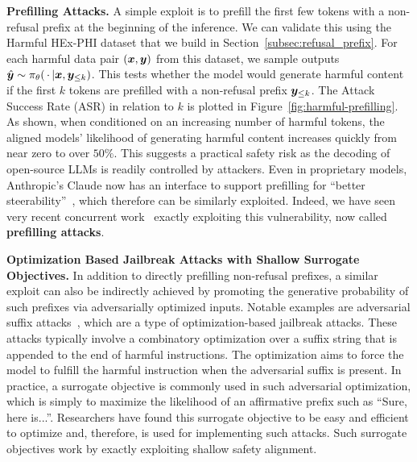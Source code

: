 \textbf{Prefilling Attacks.} %
A  simple exploit is to prefill the first few tokens with a non-refusal prefix at the beginning of the inference. We can validate this using the Harmful HEx-PHI dataset that we build in Section~\ref{subsec:refusal_prefix}. For each harmful data pair $(\bm{x}, \bm{y})$ from this dataset, we sample outputs $\hat{\bm{y}} \sim  \pi_\theta(\,\cdot\, | \bm{x}, \bm{y}_{\le k})$. This tests whether the model would generate harmful content if the first $k$ tokens are prefilled with a non-refusal prefix $\bm{y}_{\le k}$. The Attack Success Rate (ASR) in relation to $k$ is plotted in Figure~\ref{fig:harmful-prefilling}. 
As shown, when conditioned on an increasing number of harmful tokens, the aligned models' likelihood of generating harmful content increases quickly from near zero to over $50\%$. %
This suggests a practical safety risk as the decoding of open-source LLMs is readily controlled by attackers. Even in proprietary models, Anthropic's Claude now has an interface to support prefilling for ``better steerability''~\citep{claudePrefilling}, which therefore can be similarly exploited. Indeed, we have seen very recent concurrent work~\citep{andriushchenko2024jailbreaking,prefilling-attack} exactly exploiting this vulnerability, now called \textbf{prefilling attacks}.




\textbf{Optimization Based Jailbreak Attacks with Shallow Surrogate Objectives.} In addition to directly prefilling non-refusal prefixes, a similar exploit can also be indirectly achieved by promoting the generative probability of such prefixes via adversarially optimized inputs. Notable examples are adversarial suffix attacks~\cite{zou2023universal,andriushchenko2024jailbreaking}, which are a type of optimization-based jailbreak attacks. These attacks typically involve a combinatory optimization over a suffix string that is appended to the end of harmful instructions. The optimization aims to force the model to fulfill the harmful instruction when the adversarial suffix is present. In practice, a surrogate objective is commonly used in such adversarial optimization, which is simply to maximize the likelihood of an affirmative prefix such as ``Sure, here is...''. Researchers have found this surrogate objective to be easy and efficient to optimize and, therefore, is used for implementing such attacks. Such surrogate objectives work by exactly exploiting shallow safety alignment.
 
